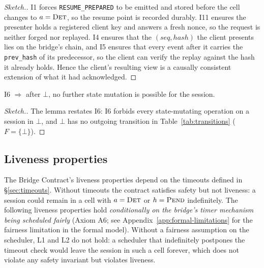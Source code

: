 \begin{proof}[Sketch.]
I1 forces \texttt{RESUME\_PREPARED} to be emitted and stored before the
cell changes to $a=\textsc{Det}$, so the resume point is recorded
durably. I11 ensures the presenter holds a registered client key and
answers a fresh nonce, so the request is neither forged nor replayed. I4
ensures that the $(\mathit{seq}, \mathit{hash})$ the client presents lies
on the bridge's chain, and I5 ensures that every event after it carries
the \texttt{prev\_hash} of its predecessor, so the client can verify the
replay against the hash it already holds. Hence the client's resulting
view is a causally consistent extension of what it had acknowledged.
\qedhere
\end{proof}

\begin{lemma}[Terminality]\label{lem:terminality}
I6 $\Rightarrow$ after $\bot$, no further state mutation is
possible for the session.
\end{lemma}

\begin{proof}[Sketch.]
The lemma restates I6: I6 forbids every state-mutating operation on a
session in $\bot$, and $\bot$ has no outgoing transition in
Table~\ref{tab:transitions} ($F=\{\bot\}$). \qedhere
\end{proof}

\subsection{Liveness properties}\label{sec:liveness}

The Bridge Contract's liveness properties depend on the timeouts
defined in \S\ref{sec:timeouts}. Without timeouts the contract
satisfies safety but not liveness: a session could remain in a cell
with $a=\textsc{Det}$ or $h=\textsc{Pend}$ indefinitely. The following
liveness properties hold \emph{conditionally on the bridge's timer
mechanism being scheduled fairly} (Axiom A6; see
Appendix~\ref{app:formal-limitations} for the fairness limitation in the
formal model). Without a fairness assumption on the scheduler, L1 and L2
do not hold: a scheduler that indefinitely postpones the timeout check
would leave the session in such a cell forever, which does not violate
any safety invariant but violates liveness.

